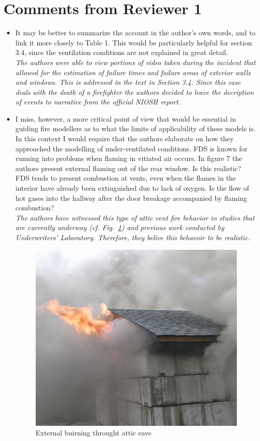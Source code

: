 \documentclass[12pt]{article}
\begin{document}
\section{Comments from Reviewer 1}
\begin{itemize}
\item It may be better to summarize the account in the author's own words, and to link it more closely to Table 1. This would be particularly helpful for section 3.4, since the ventilation conditions are not explained in great detail. \\
{\it The authors were able to view portions of video taken during the incident that allowed for the estimation of failure times and failure areas of exterior walls and windows. This is addressed in the text in Section 3.4. Since this case deals with the death of a firefighter the authors decided to leave the decription of events to narrative from the official NIOSH report.}
\item I miss, however, a more critical point of view that would be essential in guiding fire modellers as to what the limits of applicability of these models is. In this context I would require that the authors elaborate on how they approached the modelling of under-ventilated conditions. FDS is known for running into problems when flaming in vitiated air occurs. In figure 7 the authors present external flaming out of the rear window. Is this realistic? FDS tends to present combustion at vents, even when the flames in the interior have already been extinguished due to lack of oxygen. Is the flow of hot gases into the hallway after the door breakage accompanied by flaming combustion? \\
{\it The authors have witnessed this type of attic vent fire behavior in studies that are currently underway (cf. Fig.~\ref{fig:eave}) and previous work conducted by Underwriters' Laboratory. Therefore, they belive this behavoir to be realistic.}

\begin{figure}[!ht]
\centering
\includegraphics[width=.6\textwidth]{../Figures/PA020340}
\caption{External buirning throught attic eave}
\label{fig:eave}
\end{figure}


\end{itemize}
\end{document}
